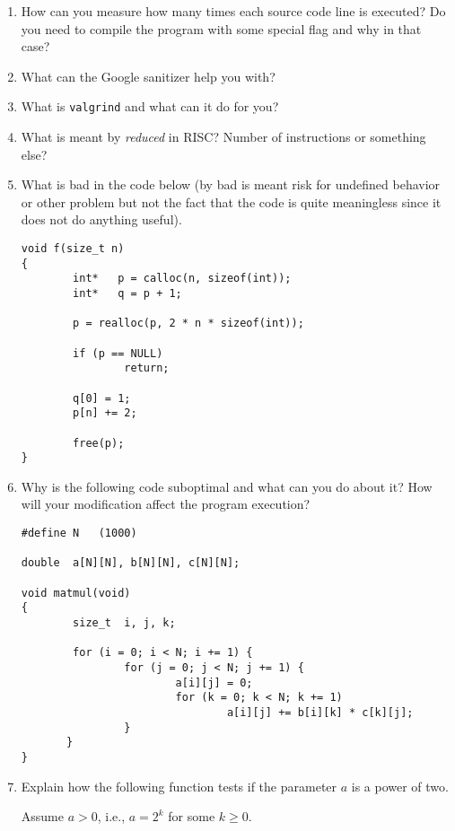 \documentclass{article}
\begin{document}
\begin{enumerate}
\item How can you measure how many times each source code line is executed? Do you need to compile the program with
some special flag and why in that case?

\item What can the Google sanitizer help you with?

\item What is {\tt valgrind} and what can it do for you?

\item What is meant by {\em reduced} in RISC? Number of instructions or something else?

\item What is bad in the code below (by bad is meant risk for undefined behavior or other problem but not the fact that the code is quite meaningless since it does not do anything useful).
\begin{verbatim}
void f(size_t n)
{
        int*   p = calloc(n, sizeof(int));
        int*   q = p + 1;

        p = realloc(p, 2 * n * sizeof(int));

        if (p == NULL)
                return;
				
       	q[0] = 1;
        p[n] += 2;

        free(p);
}

\end{verbatim}

\item
Why is the following
code suboptimal and what can you do about it? How will your modification
affect the program execution?

\begin{verbatim}
#define	N	(1000)

double	a[N][N], b[N][N], c[N][N];

void matmul(void)
{
        size_t  i, j, k;

        for (i = 0; i < N; i += 1) {
                for (j = 0; j < N; j += 1) {
                        a[i][j] = 0;
                        for (k = 0; k < N; k += 1)
                                a[i][j] += b[i][k] * c[k][j];
                }
       }
}
\end{verbatim}

\newpage
\item Explain how the following function tests if the parameter $a$ is a power of two. 

Assume $a > 0$, i.e., $a = 2^k$ for some $k \ge 0$.


\end{enumerate}
\end{document}
